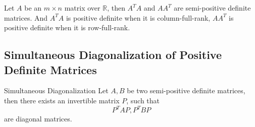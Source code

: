 \begin{theorem}{}{}
  Let $A$ be an $m \times n$ matrix over $\mathbb{R}$,
  then $A^TA$ and $AA^T$ are semi-positive definite matrices.
  And $A^TA$ is positive definite when it is column-full-rank,
  $AA^T$ is positive definite when it is row-full-rank.
\end{theorem}

\subsection{Simultaneous Diagonalization of Positive Definite Matrices}

\begin{proposition}{Simultaneous Diagonalization}{}
  Let $A, B$ be two semi-positive definite matrices,
  then there exists an invertible matrix $P$, such that
  \begin{equation}
    P^TAP, P^TBP
  \end{equation}
  are diagonal matrices.
\end{proposition}





